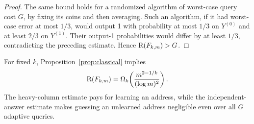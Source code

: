 \begin{proof}
The same bound holds for a randomized algorithm of worst-case query
cost $G$, by fixing its coins and then averaging.  Such an algorithm,
if it had worst-case error at most $1/3$, would output 1 with probability
at most $1/3$ on $Y^{(0)}$ and at least $2/3$ on $Y^{(1)}$.  Their
output-1 probabilities would differ by at least $1/3$, contradicting
the preceding estimate.  Hence $\mathrm R(F_{k,m})>G$.
\end{proof}

For fixed $k$, Proposition~\ref{prop:classical} implies
\[
 \mathrm R(F_{k,m})=
 \Omega_k\!\left(\frac{m^{2-1/k}}{(\log m)^2}\right).
\]
The heavy-column estimate pays for learning an address, while the
independent-answer estimate makes guessing an unlearned address
negligible even over all $G$ adaptive queries.
